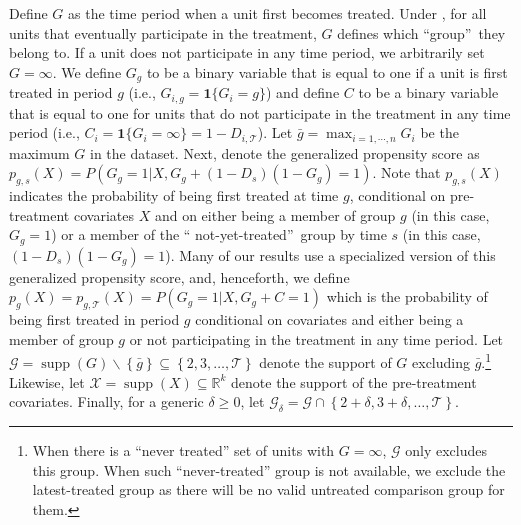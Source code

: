\documentclass[11pt]{article}%
\theoremstyle{plain}
\numberwithin{sassumption}{section}
\numberwithin{equation}{section}
\begin{document}
Define $G$ as the time period when a unit first becomes treated. Under
, for all units that eventually participate in the treatment,
$G$ defines which \textquotedblleft group\textquotedblright\ they belong to.
If a unit does not participate in any time period, we arbitrarily set
$G=\infty$. We define $G_{g}$ to be a binary variable that is equal to one if
a unit is first treated in period $g$ (i.e., $G_{i,g}=\mathbf{1}\{G_{i}=g\}$)
and define $C$ to be a binary variable that is equal to one for units that do
not {participate in the treatment in any time period} (i.e., $C_{i}%
=\mathbf{1}\{G_{i}=\infty\}=1-D_{i,\mathcal{T}}$). Let $\bar{g}=\max_{i=1,\cdots,n} G_i$ be the maximum $G$ in the dataset. Next, denote the
generalized propensity score as $p_{g,s}(X)=P(G_{g}=1|X,G_{g}+\left(
1-D_{s}\right)  \left(  1-G_{g}\right)  =1)$. Note that $p_{g,s}(X)$ indicates
the probability of being first treated at time $g$, conditional on
pre-treatment covariates $X$ and on either being a member of group $g$ {(in
this case, $G_{g}=1$)} or a member of the \textquotedblleft
not-yet-treated\textquotedblright\ group by time $s$ {(in this case,
$(1-D_{s})(1-G_{g})=1$)}. {Many of our results use a specialized version of
this generalized propensity score, and, henceforth,} we define $p_{g}%
(X)=p_{g,\mathcal{T}}(X)=P(G_{g}=1|X,G_{g}+C=1)$ {which is the probability of
being first treated in period $g$ conditional on covariates and either being a
member of group $g$ or not participating in the treatment in any time period}.
Let $\mathcal{G}=\operatorname*{supp}(G)\backslash\left\{ \bar{g}\right\}
\subseteq\left\{  2,3,\dots,\mathcal{T}\right\}  $ denote the support of $G$
excluding $\bar{g}$.\footnote{When there is a ``never treated'' set of units with $G=\infty$, $\mathcal{G}$ only excludes this group. When such ``never-treated'' group is not available, we exclude the latest-treated group as there will be no valid untreated comparison group for them.} Likewise, let $\mathcal{X}=\operatorname*{supp}%
(X)\subseteq\mathbb{R}^{k}$ denote the support of the pre-treatment
covariates. Finally, for a generic $\delta\geq0$, let $\mathcal{G}_{\delta
}=\mathcal{G\cap}\left\{  2+\delta,3+\delta,\dots,\mathcal{T}\right\}  $.  
\end{document}
